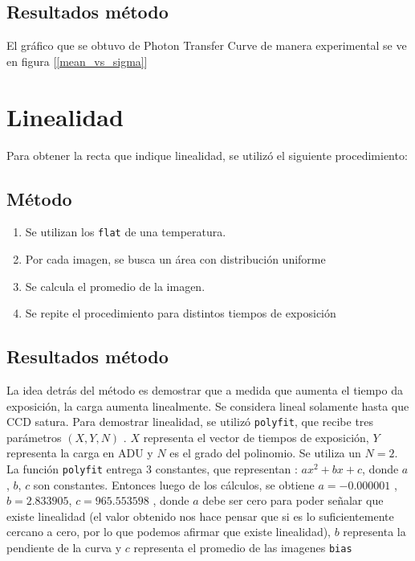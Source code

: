 \documentclass[a4paper,10pt]{article}
\begin{document}
\subsection{Resultados método}
El gráfico que se obtuvo de  Photon Transfer Curve de manera experimental se ve en figura [\ref{mean_vs_sigma}]

\section{Linealidad}
Para obtener la recta que indique linealidad, se utilizó el siguiente procedimiento:
\subsection{Método}
\begin{enumerate}
\item Se utilizan los {\tt flat} de una temperatura.
\item Por cada imagen, se busca un área con distribución uniforme
\item Se calcula el promedio de la imagen.
\item Se repite el procedimiento para distintos tiempos de exposición
\end{enumerate}
\subsection{Resultados método}
La idea detrás del método es demostrar que a medida que aumenta el tiempo da
exposición, la carga aumenta linealmente. Se considera lineal solamente hasta que CCD satura. Para demostrar linealidad, se utilizó {\tt polyfit}, que recibe
tres parámetros $(X,Y,N)$ . $X$ representa el vector de tiempos de exposición,
$Y$ representa la carga en ADU y $N$ es el grado del polinomio. Se utiliza un
$N=2$. La función {\tt polyfit} entrega 3 constantes, que representan :
$ax^2+bx+c$, donde $a$, $b$, $c$ son constantes. Entonces luego de los
cálculos, se obtiene $a= -0.000001$ , $b=2.833905$, $c= 965.553598$ , donde $a$ debe ser cero para poder señalar que existe linealidad (el valor obtenido nos hace pensar que si es lo suficientemente cercano a cero, por lo que podemos afirmar que existe linealidad), $b$
representa la pendiente de la curva y $c$ representa el promedio de las
imagenes {\tt bias}
\end{document}
